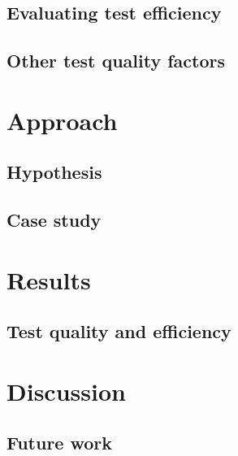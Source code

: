 \documentclass[a4paper]{report}
\begin{document}
  \section{Evaluating test efficiency}
    \label{sec:efficiency}
    


  \section{Other test quality factors}
    \label{sec:quality}
    


\chapter{Approach}

  

  \section{Hypothesis}
  \label{sec:hypothesis}
  

  \section{Case study}
  


\chapter{Results}
\label{chap:results}

  

  \section{Test quality and efficiency}
  


\chapter{Discussion}
\label{chap:discussion}

  

  \section{Future work}
  
\end{document}
